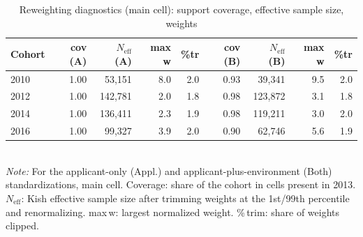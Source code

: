 \begin{table}[htbp]\centering
\caption{Reweighting diagnostics (main cell): support coverage, effective sample size, weights}
\label{tab:P3weights}
\footnotesize
\setlength{\tabcolsep}{4pt}
\begin{tabular}{lrrrrrrrr}
\toprule
Cohort & cov (A) & $N_{\mathrm{eff}}$ (A) & max w & \%tr & cov (B) & $N_{\mathrm{eff}}$ (B) & max w & \%tr \\
\midrule
2010 & 1.00 & 53,151 & 8.0 & 2.0 & 0.93 & 39,341 & 9.5 & 2.0 \\
2012 & 1.00 & 142,781 & 2.0 & 1.8 & 0.98 & 123,872 & 3.1 & 1.8 \\
2014 & 1.00 & 136,411 & 2.3 & 1.9 & 0.98 & 119,211 & 3.0 & 2.0 \\
2016 & 1.00 & 99,327 & 3.9 & 2.0 & 0.90 & 62,746 & 5.6 & 1.9 \\
\bottomrule
\end{tabular}
\\[3pt]{\footnotesize \textit{Note:} For the applicant-only (Appl.) and applicant-plus-environment (Both) standardizations, main cell. Coverage: share of the cohort in cells present in 2013. $N_{\mathrm{eff}}$: Kish effective sample size after trimming weights at the 1st/99th percentile and renormalizing. max\,w: largest normalized weight. \%\,trim: share of weights clipped.}
\end{table}
